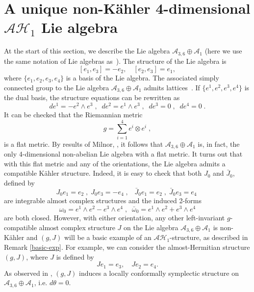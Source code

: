\documentclass{amsart}
\begin{document}
\section{A unique non-K\"ahler 4-dimensional $\mathcal{AH}_1$ Lie algebra}

At the start of this section, we describe the Lie algebra $\mathcal{A}_{3,6}\oplus \mathcal{A}_1$ (here we use the same notation of Lie algebras as~\cite{Pat}). The structure of the Lie algebra is 
$$[e_1,e_3]=-e_2,\quad [e_2,e_3]=e_1,$$
where $\{e_1,e_2,e_3,e_4\}$ is a basis of the Lie algebra.
The associated simply connected group to the Lie algebra $\mathcal{A}_{3,6}\oplus \mathcal{A}_1$ admits lattices~\cite{B}. If 
$\{e^1,e^2,e^3,e^4\}$ is the dual basis, the structure equations can be rewritten as
$$ d e^1 = - e^2 \wedge e^3 \; , \; \; d e^2 =  e^1 \wedge e^3\; , \; \; d e^3 = 0 \; , \; \; d e^4 = 0 \; .$$
It can be checked that the Riemannian metric 
$$g=\sum_{i=1}^4e^i\otimes e^i \; ,$$ 
is a flat metric. By results of Milnor, \cite{Mil}, it follows that $\mathcal{A}_{3,6}\oplus \mathcal{A}_1$ is, in fact, the only 4-dimensional non-abelian Lie algebra with a flat metric. It turns out that with this flat metric and any of the orientations, the Lie algebra admits a compatible K\"ahler structure. Indeed, it is easy to check that both $J_0$ and $\bar{J}_0$, defined by
$$ J_0 e_1 = e_2 \; , \; J_0 e_3 = -e_4 \; , \; \; \; \bar{J}_0 e_1 = e_2 \; , \; \bar{J}_0 e_3 = e_4 \; $$
are integrable almost complex structures and the induced 2-forms
$$\omega_0 = e^1 \wedge e^2 - e^3 \wedge e^4 \; , \; \; \bar{\omega}_0 = e^1 \wedge e^2 + e^3 \wedge e^4 $$
are both closed. However, with either orientation, any other left-invariant $g$-compatible almost complex structure $J$ on the Lie algebra $\mathcal{A}_{3,6}\oplus \mathcal{A}_1$ is non-K\"ahler and $(g,J)$ will be a basic example
of an $\mathcal{AH}_1$-structure, as described in Remark \ref{basic-exp}. For example, we can consider the almost-Hermitian structure $(g,J)$, where $J$ is defined by
$$Je_1=e_3,\quad Je_2=e_4.$$
As observed in \cite{BL}, $(g,J)$ induces a locally conformally symplectic structure on $\mathcal{A}_{3,6}\oplus \mathcal{A}_1$, i.e. $d\theta = 0$. 

\end{document}
